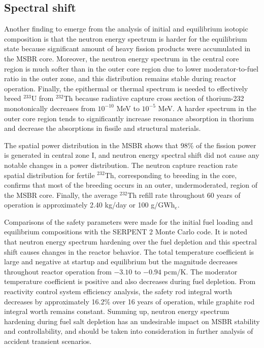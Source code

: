 \subsection{Spectral shift}
Another finding to emerge from the analysis of initial and equilibrium isotopic composition is that the neutron energy spectrum is harder for the equilibrium state because significant amount of heavy fission products were accumulated in the \gls{MSBR} core. Moreover, the neutron energy spectrum in the central core region is much softer than in the outer core region due to lower moderator-to-fuel ratio in the outer zone, and this distribution remains stable during reactor operation. Finally, the epithermal or thermal spectrum is needed to effectively breed $^{233}$U from $^{232}$Th because radiative capture cross section of thorium-232 monotonically decreases from $10^{-10}$ MeV to $10^{-5}$ MeV. A harder spectrum in the outer core region tends to significantly increase resonance absorption in thorium and decrease the absorptions in fissile and structural materials. 

The spatial power distribution in the \gls{MSBR} shows that 98\% of the fission power is generated in central zone I, and neutron energy spectral shift did not cause any notable changes in a power distribution. The neutron capture reaction rate spatial distribution for fertile $^{232}$Th, corresponding to breeding in the core, confirms that most of the breeding occurs in an outer, undermoderated, region of the \gls{MSBR} core. Finally, the average $^{232}$Th refill rate throughout 60 years of operation is approximately 2.40 kg/day or 100 g/GWh$_e$.

Comparisons of the safety parameters were made for the initial fuel loading and equilibrium compositions with the SERPENT 2 Monte Carlo code. It is noted that neutron energy spectrum hardening over the fuel depletion and this spectral shift causes changes in the reactor behavior. The total temperature coefficient is large and negative at startup and equilibrium but the magnitude decreases throughout reactor operation from $-3.10$ to $-0.94$ pcm/K. The moderator temperature coefficient is positive and also decreases during fuel depletion. From reactivity control system efficiency analysis, the safety rod integral worth decreases by approximately 16.2\% over 16 years of operation, while graphite rod integral worth remains constant. Summing up, neutron energy spectrum hardening during fuel salt depletion has an undesirable impact on \gls{MSBR} stability and controllability, and should be taken into consideration in further analysis of accident transient scenarios.


